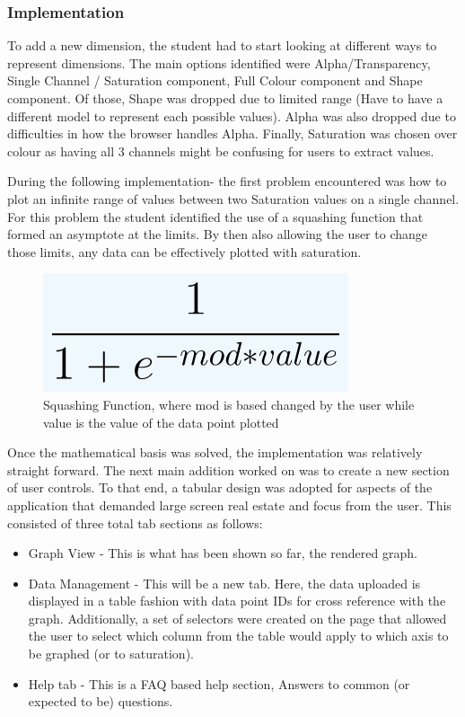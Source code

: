 \subsubsection{Implementation}
To add a new dimension, the student had to start looking at different ways to represent dimensions. The main options identified were Alpha/Transparency, Single Channel / Saturation component, Full Colour component and Shape component.
Of those, Shape was dropped due to limited range (Have to have a different model to represent each possible values). Alpha was also dropped due to difficulties in how the browser handles Alpha. Finally, Saturation was chosen over colour as having all 3 channels might be confusing for users to extract values.

During the following implementation- the first problem encountered was how to plot an infinite range of values between two Saturation values on a single channel. For this problem the student identified the use of a squashing function that formed an asymptote at the limits. By then also allowing the user to change those limits, any data can be effectively plotted with saturation.

\begin{figure}[h]
    \centering
    \includegraphics[width=0.5\columnwidth]{author-files/figures/squashFunc.PNG}
    \caption{Squashing Function, where mod is based changed by the user while value is the value of the data point plotted}
    \label{fig:function}
\end{figure}

Once the mathematical basis was solved, the implementation was relatively straight forward.
The next main addition worked on was to create a new section of user controls. To that end, a tabular design was adopted for aspects of the application that demanded large screen real estate and focus from the user. This consisted of three total tab sections as follows:
\begin{itemize}
    \item Graph View - This is what has been shown so far, the rendered graph.
    \item Data Management - This will be a new tab. Here, the data uploaded is displayed in a table fashion with data point IDs for cross reference with the graph. Additionally, a set of selectors were created on the page that allowed the user to select which column from the table would apply to which axis to be graphed (or to saturation).
    \item Help tab - This is a FAQ based help section, Answers to common (or expected to be) questions.
\end{itemize}

